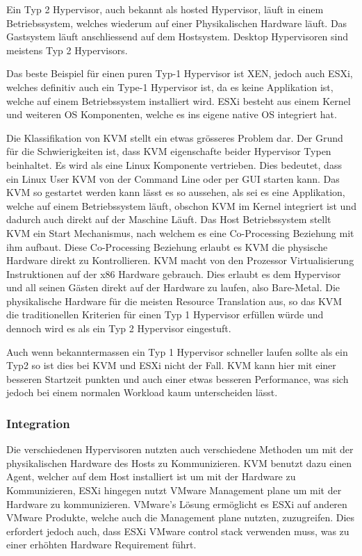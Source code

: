 \documentclass[14pt]{extreport}
\begin{document}
Ein Typ 2 Hypervisor, auch bekannt als hosted Hypervisor, läuft in einem Betriebssystem, welches wiederum auf einer Physikalischen Hardware läuft. Das Gastsystem läuft anschliessend auf dem Hostsystem. Desktop Hypervisoren sind meistens Typ 2 Hypervisors.

Das beste Beispiel für einen puren Typ-1 Hypervisor ist XEN, jedoch auch ESXi, welches definitiv auch ein Type-1 Hypervisor ist, da es keine Applikation ist, welche auf einem Betriebssystem installiert wird. ESXi besteht aus einem Kernel und weiteren OS Komponenten, welche es ins eigene native OS integriert hat.

Die Klassifikation von KVM stellt ein etwas grösseres Problem dar. Der Grund für die Schwierigkeiten ist, dass KVM eigenschafte beider Hypervisor Typen beinhaltet. Es wird als eine Linux Komponente vertrieben. Dies bedeutet, dass ein Linux User KVM von der Command Line oder per GUI starten kann. Das KVM so gestartet werden kann lässt es so aussehen, als sei es eine Applikation, welche auf einem Betriebssystem läuft, obschon KVM im Kernel integriert ist und dadurch auch direkt auf der Maschine Läuft.
Das Host Betriebssystem stellt KVM ein Start Mechanismus, nach welchem es eine Co-Processing Beziehung mit ihm aufbaut. Diese Co-Processing Beziehung erlaubt es KVM die physische Hardware direkt zu Kontrollieren. KVM macht von den Prozessor Virtualisierung Instruktionen auf der x86 Hardware gebrauch. Dies erlaubt es dem Hypervisor und all seinen Gästen direkt auf der Hardware zu laufen, also Bare-Metal. Die physikalische Hardware für die meisten Resource Translation aus, so das KVM die traditionellen Kriterien für einen Typ 1 Hypervisor erfüllen würde und dennoch wird es als ein Typ 2 Hypervisor eingestuft.

Auch wenn bekanntermassen ein Typ 1 Hypervisor schneller laufen sollte als ein Typ2 so ist dies bei KVM und ESXi nicht der Fall. KVM kann hier mit einer besseren Startzeit punkten und auch einer etwas besseren Performance, was sich jedoch bei einem normalen Workload kaum unterscheiden lässt.

\subsubsection{Integration}
Die verschiedenen Hypervisoren nutzten auch verschiedene Methoden um mit der physikalischen Hardware des Hosts zu Kommunizieren. KVM benutzt dazu einen Agent, welcher auf dem Host installiert ist um mit der Hardware zu Kommunizieren, ESXi hingegen nutzt VMware Management plane um mit der Hardware zu kommunizieren. VMware's Lösung ermöglicht es ESXi auf anderen VMware Produkte, welche auch die Management plane nutzten, zuzugreifen. Dies erfordert jedoch auch, dass ESXi VMware control stack verwenden muss, was zu einer erhöhten Hardware Requirement führt.
\end{document}
